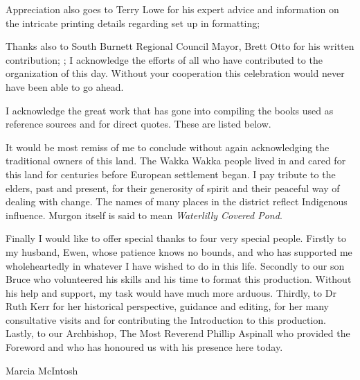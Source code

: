 Appreciation also goes to Terry Lowe for his expert advice and information on the intricate printing details regarding set up in formatting;



Thanks also to South Burnett Regional Council Mayor, Brett Otto for his written contribution; ; I acknowledge the efforts of all who have contributed to the organization of this day. Without your cooperation this celebration would never have been able to go ahead.



I acknowledge the great work that has gone into compiling the books used as reference sources and for direct quotes. These are listed below.



It would be most remiss of me to conclude without again acknowledging the traditional owners of this land. The Wakka Wakka people lived in and cared for this land for centuries before European settlement began. I pay tribute to the elders, past and present, for their generosity of spirit and their peaceful way of dealing with change. The names of many places in the district reflect Indigenous influence. Murgon itself is said to mean \emph{Waterlilly Covered Pond}.



Finally I would like to offer special thanks to four very special people. Firstly to my husband, Ewen, whose patience knows no bounds, and who has supported me wholeheartedly in whatever I have wished to do in this life. Secondly to our son Bruce who volunteered his skills and his time to format this production. Without his help and support, my task would have much more arduous. Thirdly, to Dr Ruth Kerr for her historical perspective, guidance and editing, for her many consultative visits and for contributing the Introduction to this production. Lastly, to our Archbishop, The Most Reverend Phillip Aspinall who provided the Foreword and who has honoured us with his presence here today.



\balance
Marcia McIntosh

